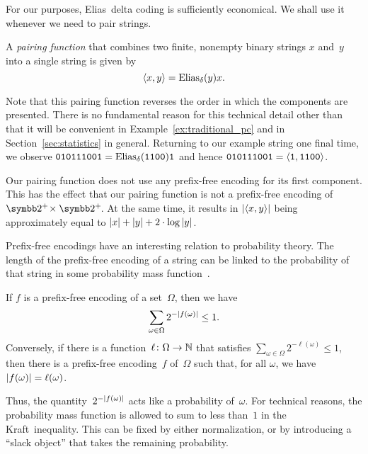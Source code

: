 For our purposes, Elias~delta coding is sufficiently economical.
We shall use it whenever we need to pair strings.
\begin{definition}
\label{def:pairing_function}%
  A \emph{pairing function} that combines two finite, nonempty binary strings $x$ and~$y$ into a single string is given by
  \begin{equation*}
    {\langle x, y\rangle} = \operatorname{Elias}_\delta(y)x.
  \end{equation*}
\end{definition}

Note that this pairing function reverses the order in which the components are presented.
There is no fundamental reason for this technical detail other than that it will be convenient in Example~\ref{ex:traditional_pc} and in Section~\ref{sec:statistics} in general.
Returning to our example string one final time, we observe $\textnormal{\texttt{010111001}} = \operatorname{Elias}_\delta(\textnormal{\texttt{1100}})\textnormal{\texttt{1}}$ and hence $\textnormal{\texttt{010111001}} = {\langle \textnormal{\texttt{1}}, \textnormal{\texttt{1100}}\rangle}$.

Our pairing function does not use any prefix-free encoding for its first component.
This has the effect that our pairing function is not a prefix-free encoding of~$\binary^+\! \times \binary^+\!$.
At the same time, it results in ${\lvert{\langle x, y\rangle}\rvert}$ being approximately equal to ${\lvert x\rvert} + {\lvert y\rvert} + 2 \cdot \log {\lvert y\rvert}$.

Prefix-free encodings have an interesting relation to probability theory.
The length of the prefix-free encoding of a string can be linked to the probability of that string in some probability mass function~\parencite{cover2006elements,li2008introduction}.
\begin{theorem}
  If $f$ is a prefix-free encoding of a set~$\Omega$, then we have
  \begin{equation*}
    \sum_{\omega \in \Omega} 2^{-{\lvert f(\omega)\rvert}} \le 1.
  \end{equation*}
  Conversely, if there is a function~$\ell\colon \Omega \to \mathbb{N}$ that satisfies $\sum_{\omega \in \Omega} 2^{-\ell(\omega)} \le 1$, then there is a prefix-free encoding~$f$ of~$\Omega$ such that, for all $\omega$, we have ${\lvert f(\omega)\rvert} = \ell(\omega)$.
\end{theorem}
Thus, the quantity~$2^{-{\lvert f(\omega)\rvert}}$ acts like a probability of~$\omega$.
For technical reasons, the probability mass function is allowed to sum to less than~$1$ in the Kraft~inequality.
This can be fixed by either normalization, or by introducing a \enquote{slack object} that takes the remaining probability.


